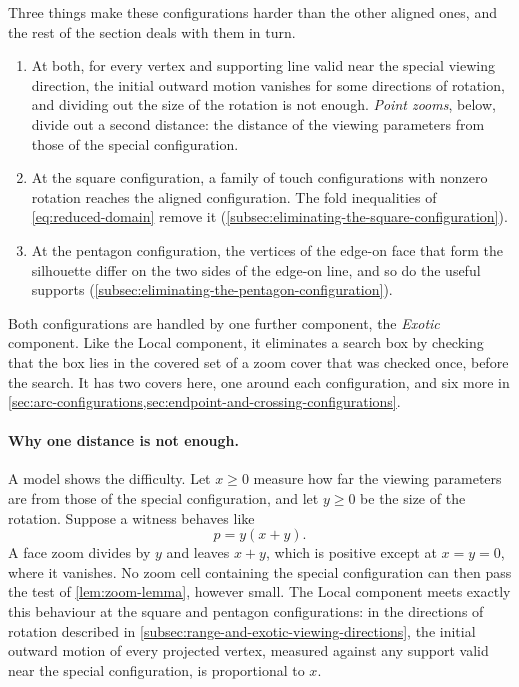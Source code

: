 Three things make these configurations harder than the other aligned
ones, and the rest of the section deals with them in turn.
\begin{enumerate}
  \item At both, for every vertex and supporting line valid near the special
    viewing direction, the initial outward motion vanishes for some
    directions of rotation, and dividing out the size of
    the rotation is not enough. \emph{Point zooms}, below, divide out a
    second distance: the distance of the viewing parameters from those of
    the special configuration.
  \item At the square configuration, a family of touch configurations with
    nonzero rotation reaches the aligned configuration. The fold
    inequalities of \cref{eq:reduced-domain} remove it
    (\cref{subsec:eliminating-the-square-configuration}).
  \item At the pentagon configuration, the vertices of the edge-on face that
    form the silhouette differ on the two sides of the edge-on line, and so
    do the useful supports (\cref{subsec:eliminating-the-pentagon-configuration}).
\end{enumerate}
Both configurations are handled by one further component, the
\emph{Exotic} component. Like the Local component, it eliminates a
search box by checking that the box lies in the covered set of a zoom
cover that was checked once, before the search. It has two covers here,
one around each configuration, and six more in
\cref{sec:arc-configurations,sec:endpoint-and-crossing-configurations}.

\paragraph{Why one distance is not enough.}
A model shows the difficulty. Let $x\ge0$ measure how far the viewing
parameters are from those of the special configuration, and let $y\ge0$
be the size of the rotation. Suppose a witness behaves like
\[
  p=y(x+y).
\]
A face zoom divides by $y$ and leaves $x+y$, which is positive except at
$x=y=0$, where it vanishes. No zoom cell containing the special
configuration can then pass the test of \cref{lem:zoom-lemma}, however
small. The Local component meets exactly this behaviour at the square and
pentagon configurations: in the directions of rotation described in
\cref{subsec:range-and-exotic-viewing-directions}, the initial
outward motion of every projected vertex, measured against any support
valid near the special configuration, is proportional to $x$.

